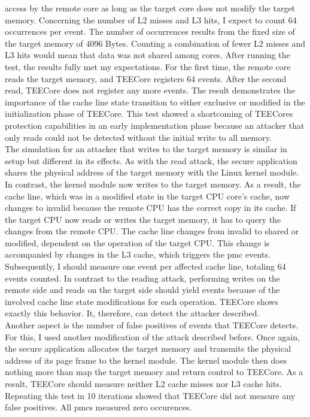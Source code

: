 access by the remote core as long as the target core does not modify the target
memory. Concerning the number of L2 misses and L3 hits, I expect to count 64
occurrences per event. The number of occurrences results from the fixed size of
the target memory of 4096 Bytes. Counting a combination of fewer L2 misses and
L3 hits would mean that data was not shared among cores. After running the test,
the results fully met my expectations. For the first time, the remote core reads
the target memory, and TEECore registers 64 events. After the second read,
TEECore does not register any more events. The result demonstrates the
importance of the cache line state transition to either exclusive or modified in
the initialization phase of TEECore. This test showed a shortcoming of TEECores
protection capabilities in an early implementation phase because an attacker
that only reads could not be detected without the initial write to all memory.\\

The simulation for an attacker that writes to the target memory is similar in
setup but different in its effects. As with the read attack, the secure
application shares the physical address of the target memory with the Linux
kernel module. In contrast, the kernel module now writes to the target memory.
As a result, the cache line, which was in a modified state in the target CPU
core's cache, now changes to invalid because the remote CPU has the correct copy
in its cache. If the target CPU now reads or writes the target memory, it has to
query the changes from the remote CPU. The cache line changes from invalid to
shared or modified, dependent on the operation of the target CPU. This change is
accompanied by changes in the L3 cache, which triggers the \gls{pmc} events.
Subsequently, I should measure one event per affected cache line, totaling 64
events counted. In contrast to the reading attack, performing writes on the
remote side and reads on the target side should yield events because of the
involved cache line state modifications for each operation. TEECore shows
exactly this behavior. It, therefore, can detect the attacker described.\\

Another aspect is the number of false positives of events that TEECore detects.
For this, I used another modification of the attack described before. Once
again, the secure application allocates the target memory and transmits the
physical address of its page frame to the kernel module. The kernel module then
does nothing more than map the target memory and return control to TEECore. As a
result, TEECore should measure neither L2 cache misses nor L3 cache hits.
Repeating this test in 10 iterations showed that TEECore did not measure any
false positives. All \glspl{pmc} measured zero occurences.\\

